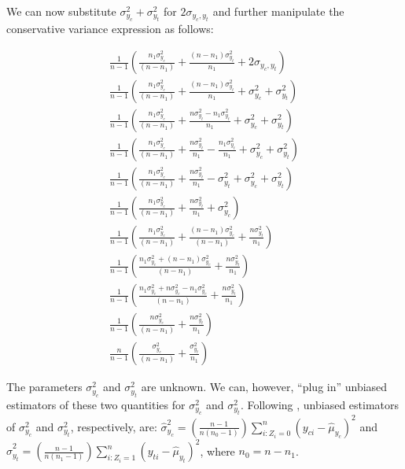 \documentclass[12pt,leqno]{article}
\theoremstyle{newstyle}
\begin{document}
We can now substitute \(\sigma^2_{y_c} + \sigma^2_{y_t}\) for
\(2\sigma_{y_c, y_t}\) and further manipulate the conservative variance
expression as follows:

\begin{align*}
\frac{1}{n - 1}\left(\frac{n_1 \sigma^2_{y_c}}{\left(n - n_1\right)} + \frac{\left(n - n_1\right) \sigma^2_{y_t}}{n_1} + 2\sigma_{y_c, y_t}\right)\\
\frac{1}{n - 1}\left(\frac{n_1 \sigma^2_{y_c}}{\left(n - n_1\right)} + \frac{\left(n - n_1\right) \sigma^2_{y_t}}{n_1} + \sigma^2_{y_c} + \sigma^2_{y_t}\right) \\
\frac{1}{n - 1}\left(\frac{n_1 \sigma^2_{y_c}}{\left(n - n_1\right)} + \frac{n\sigma^2_{y_t} - n_1\sigma^2_{y_t}}{n_1} + \sigma^2_{y_c} + \sigma^2_{y_t}\right) \\ 
\frac{1}{n - 1}\left(\frac{n_1 \sigma^2_{y_c}}{\left(n - n_1\right)} + \frac{n\sigma^2_{y_t}}{n_1} - \frac{n_1\sigma^2_{y_t}}{n_1} + \sigma^2_{y_c} + \sigma^2_{y_t}\right) \\
\frac{1}{n - 1}\left(\frac{n_1 \sigma^2_{y_c}}{\left(n - n_1\right)} + \frac{n\sigma^2_{y_t}}{n_1} - \sigma^2_{y_t} + \sigma^2_{y_c} +  \sigma^2_{y_t}\right) \\  
\frac{1}{n - 1}\left(\frac{n_1 \sigma^2_{y_c}}{\left(n - n_1\right)} + \frac{n\sigma^2_{y_t}}{n_1} + \sigma^2_{y_c} \right) \\ 
\frac{1}{n - 1}\left(\frac{n_1 \sigma^2_{y_c}}{\left(n - n_1\right)} + \frac{\left(n - n_1\right)\sigma^2_{y_c}}{\left(n - n_1\right)} + \frac{n\sigma^2_{y_t}}{n_1} \right) \\  
\frac{1}{n - 1}\left(\frac{n_1 \sigma^2_{y_c} + \left(n - n_1\right)\sigma^2_{y_c}}{\left(n - n_1\right)} + \frac{n\sigma^2_{y_t}}{n_1} \right) \\
\frac{1}{n - 1}\left(\frac{n_1 \sigma^2_{y_c} + n\sigma^2_{y_c} - n_1\sigma^2_{y_c}}{\left(n - n_1\right)} + \frac{n\sigma^2_{y_t}}{n_1} \right) \\
\frac{1}{n - 1}\left(\frac{n\sigma^2_{y_c}}{\left(n - n_1\right)} + \frac{n\sigma^2_{y_t}}{n_1} \right) \\
\frac{n}{n - 1}\left(\frac{\sigma^2_{y_c}}{\left(n - n_1\right)} + \frac{\sigma^2_{y_t}}{n_1} \right)  
\end{align*}

The parameters \(\sigma^2_{y_c}\) and \(\sigma^2_{y_t}\) are unknown. We
can, however, ``plug in'' unbiased estimators of these two quantities
for \(\sigma^2_{y_c}\) and \(\sigma^2_{y_t}\). Following
\citet[Theorem 2.4]{cochran1977}, unbiased estimators of
\(\sigma^2_{y_c}\) and \(\sigma^2_{y_t}\), respectively, are:
\(\widehat{\sigma}^2_{y_c} = \left(\frac{n - 1}{n\left(n_0 - 1\right)}\right)\sum \limits_{i: Z_i = 0}^n \left(y_{ci} - \widehat{\mu}_{y_c}\right)^2\)
and
\(\widehat{\sigma}^2_{y_t} = \left(\frac{n - 1}{n\left(n_1 - 1\right)}\right)\sum \limits_{i: Z_i = 1}^{n} \left(y_{ti} - \widehat{\mu}_{y_t}\right)^2\),
where \(n_0 = n - n_1\).
\end{document}
